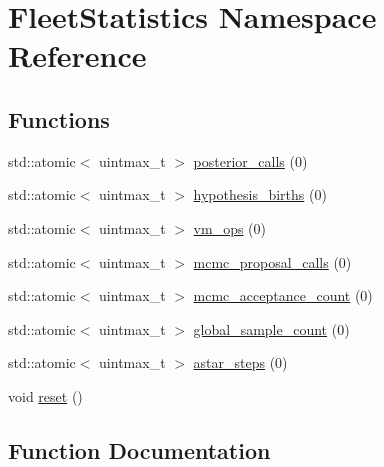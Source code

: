 \hypertarget{namespace_fleet_statistics}{}\section{Fleet\+Statistics Namespace Reference}
\label{namespace_fleet_statistics}
\subsection*{Functions}
\begin{DoxyCompactItemize}
\item 
std\+::atomic$<$ uintmax\+\_\+t $>$ \hyperlink{namespace_fleet_statistics_a6dadb4af01dd69f64cbdf10bdcc3cd68}{posterior\+\_\+calls} (0)
\item 
std\+::atomic$<$ uintmax\+\_\+t $>$ \hyperlink{namespace_fleet_statistics_a1616a32e08aa997f52c5b85a604ef9e5}{hypothesis\+\_\+births} (0)
\item 
std\+::atomic$<$ uintmax\+\_\+t $>$ \hyperlink{namespace_fleet_statistics_ad64460a8eef2b5d661f5cf19a02e9480}{vm\+\_\+ops} (0)
\item 
std\+::atomic$<$ uintmax\+\_\+t $>$ \hyperlink{namespace_fleet_statistics_a1f9e34ed6f510be04fe18bc41d07be49}{mcmc\+\_\+proposal\+\_\+calls} (0)
\item 
std\+::atomic$<$ uintmax\+\_\+t $>$ \hyperlink{namespace_fleet_statistics_ad26d3ef814229c9d5a652a44449bca21}{mcmc\+\_\+acceptance\+\_\+count} (0)
\item 
std\+::atomic$<$ uintmax\+\_\+t $>$ \hyperlink{namespace_fleet_statistics_a52f04256509fd8aa658d16b1bf459060}{global\+\_\+sample\+\_\+count} (0)
\item 
std\+::atomic$<$ uintmax\+\_\+t $>$ \hyperlink{namespace_fleet_statistics_ac5bdb9bf75dd163e4aaf498efe244cf2}{astar\+\_\+steps} (0)
\item 
void \hyperlink{namespace_fleet_statistics_a84ed12eec0dea83a0b4bba34e2362985}{reset} ()
\end{DoxyCompactItemize}


\subsection{Function Documentation}
\mbox{\label{namespace_fleet_statistics_ac5bdb9bf75dd163e4aaf498efe244cf2}} 
